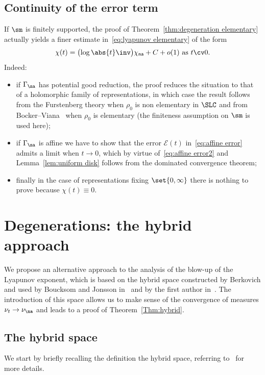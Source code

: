 \subsection{Continuity of the error term}\label{subs:continuity elementary}

If $\sm$ is finitely supported, the proof of Theorem~\ref{thm:degeneration elementary} actually yields a finer estimate in~\eqref{eq:lyapunov elementary} of the form
\[
\chi(t) = \big({\log\abs{t}\inv} \big) \chi_{\sf na} + C + o(1) \text{ as } t\cv 0.
\]
Indeed:
\begin{itemize}
\item if $\Gamma_\na$ has potential good reduction, the proof reduces the situation to that of a holomorphic family of representations, in which case the result follows from the Furstenberg theory when $\rho_0$ is non elementary in $\SLC$ and from Bocker--Viana~\cite{bocker-viana} when $\rho_0$ is elementary (the finiteness assumption on $\sm$ is used here);
\item if $\Gamma_\na$ is affine we have to show that the error $\mathcal{E}(t)$ in~\eqref{eq:affine error} admits a limit when $t\to0$, which by virtue of~\eqref{eq:affine error2} and Lemma~\ref{lem:uniform disk} follows from the dominated convergence theorem;
\item finally in the case of representations fixing $\set{0, \infty}$ there is nothing to prove because $\chi(t)\equiv 0$.
\end{itemize}


\section{Degenerations: the hybrid approach}\label{sec:hybrid}

We propose an alternative approach to the analysis of the blow-up of the Lyapunov exponent, which is based on the hybrid space constructed by Berkovich and used by Boucksom and Jonsson in~\cite{boucksom-jonsson} and by the first author in~\cite{degeneration}. The introduction of this space allows us to make sense of the convergence of measures $\nu_t \to \nu_{\na}$ and leads to a proof of Theorem~\ref{Thm:hybrid}.

\subsection{The hybrid space}\label{sec:hybrid detail}

We start by briefly recalling the definition the hybrid space, referring to~\cite{boucksom-jonsson,degeneration} for more details.

